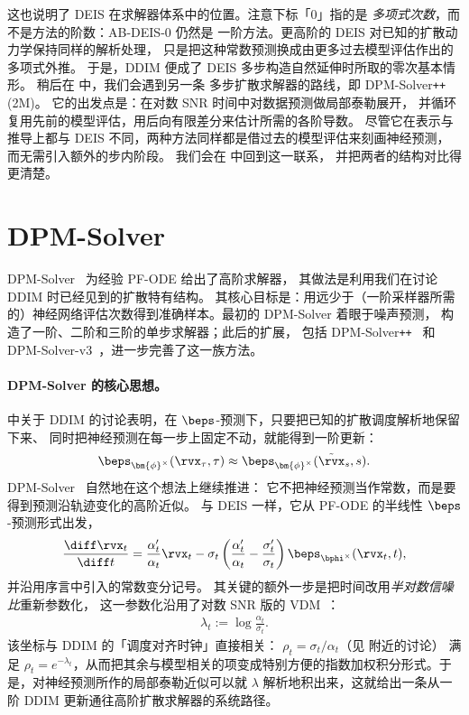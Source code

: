 
这也说明了 DEIS 在求解器体系中的位置。注意下标「$0$」指的是
\emph{多项式次数}，而不是方法的阶数：AB-DEIS-0 仍然是
一阶方法。更高阶的 DEIS 对已知的扩散动力学保持同样的解析处理，
只是把这种常数预测换成由更多过去模型评估作出的多项式外推。
于是，DDIM 便成了 DEIS 多步构造自然延伸时所取的零次基本情形。
稍后在  中，我们会遇到另一条
多步扩散求解器的路线，即 DPM-Solver\texttt{++}(2M)。
它的出发点是：在对数 SNR 时间中对数据预测做局部泰勒展开，
并循环复用先前的模型评估，用后向有限差分来估计所需的各阶导数。
尽管它在表示与推导上都与 DEIS 不同，两种方法同样都是借过去的模型评估来刻画神经预测，而无需引入额外的步内阶段。
我们会在  中回到这一联系，
并把两者的结构对比得更清楚。


\section{\texorpdfstring{DPM-Solver}{DPM-Solver}}\label{sec:dpm}

DPM-Solver~\citep{lu2022dpm} 为经验 PF-ODE 给出了高阶求解器，
其做法是利用我们在讨论 DDIM 时已经见到的扩散特有结构。
其核心目标是：用远少于（一阶采样器所需的）神经网络评估次数得到准确样本。最初的 DPM-Solver 着眼于噪声预测，
构造了一阶、二阶和三阶的单步求解器；此后的扩展，
包括 DPM-Solver\texttt{++}~\citep{lu2022dpm2} 和
DPM-Solver-v3~\citep{zheng2023dpm}，进一步完善了这一族方法。

\paragraph{DPM-Solver 的核心思想。}
 中关于 DDIM 的讨论表明，在
$\beps$-预测下，只要把已知的扩散调度解析地保留下来、
同时把神经预测在每一步上固定不动，就能得到一阶更新：
\[
\beps_{\bm{\phi}^\times}(\rvx_\tau,\tau)
\approx
\beps_{\bm{\phi}^\times}(\tilde\rvx_s,s).
\]
DPM-Solver~\citep{lu2022dpm} 自然地在这个想法上继续推进：
它不把神经预测当作常数，而是要得到预测沿轨迹变化的高阶近似。
与 DEIS 一样，它从 PF-ODE 的半线性 $\beps$-预测形式出发，
\begin{align}
\label{eq:noise-alpha-sigma}
\frac{\diff \rvx_t}{\diff t}
=
\frac{\alpha_t'}{\alpha_t}\rvx_t
-
\sigma_t
\left(
\frac{\alpha_t'}{\alpha_t}
-
\frac{\sigma_t'}{\sigma_t}
\right)
\beps_{\bphi^\times}(\rvx_t,t),
\end{align}
并沿用序言中引入的常数变分记号。
其关键的额外一步是把时间改用\emph{半对数信噪比}重新参数化，
这一参数化沿用了对数 SNR 版的
VDM~\citep{kingma2021variational}：
\begin{align}
\label{eq:lambda}
\lambda_t
:=
\log\frac{\alpha_t}{\sigma_t}.
\end{align}
该坐标与 DDIM 的「调度对齐时钟」直接相关：
$\rho_t=\sigma_t/\alpha_t$（见  附近的讨论）
满足 $\rho_t=e^{-\lambda_t}$，从而把其余与模型相关的项变成特别方便的指数加权积分形式。于是，对神经预测所作的局部泰勒近似可以就 $\lambda$ 解析地积出来，这就给出一条从一阶 DDIM 更新通往高阶扩散求解器的系统路径。


